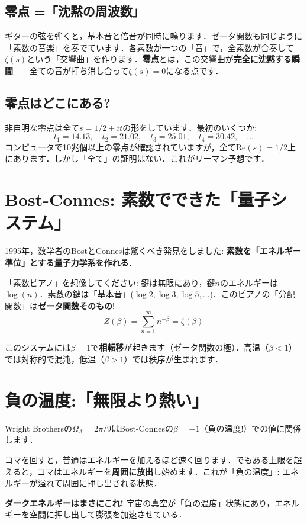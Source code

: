 \documentclass[11pt,a4paper]{article}
\begin{document}
\subsection{零点 =「沈黙の周波数」}
\begin{tcolorbox}[colback=blue!5,colframe=blue!50!black,title=アナロジー: ギターの弦]
ギターの弦を弾くと，基本音と倍音が同時に鳴ります．ゼータ関数も同じように「素数の音楽」を奏でています．各素数が一つの「音」で，全素数が合奏して$\zeta(s)$という「交響曲」を作ります．\textbf{零点}とは，この交響曲が\textbf{完全に沈黙する瞬間}——全ての音が打ち消し合って$\zeta(s)=0$になる点です．
\end{tcolorbox}
\subsection{零点はどこにある?}
非自明な零点は全て$s = 1/2 + it$の形をしています．最初のいくつか:
$$t_1 = 14.13,\quad t_2 = 21.02,\quad t_3 = 25.01,\quad t_4 = 30.42,\quad \ldots$$
コンピュータで10兆個以上の零点が確認されていますが，全て$\mathrm{Re}(s)=1/2$上にあります．しかし「全て」の証明はない．これがリーマン予想です．

\section{Bost-Connes: 素数でできた「量子システム」}
1995年，数学者のBostとConnesは驚くべき発見をしました: \textbf{素数を「エネルギー準位」とする量子力学系を作れる}．
\begin{tcolorbox}[colback=blue!5,colframe=blue!50!black,title=アナロジー: 素数ピアノ]
「素数ピアノ」を想像してください: 鍵は無限にあり，鍵$n$のエネルギーは$\log(n)$．素数の鍵は「基本音」($\log 2, \log 3, \log 5, \ldots$)．このピアノの「分配関数」は\textbf{ゼータ関数そのもの}!
$$Z(\beta) = \sum_{n=1}^{\infty} n^{-\beta} = \zeta(\beta)$$
\end{tcolorbox}
このシステムには$\beta = 1$で\textbf{相転移}が起きます（ゼータ関数の極）．高温（$\beta < 1$）では対称的で混沌，低温（$\beta > 1$）では秩序が生まれます．

\section{負の温度:「無限より熱い」}
Wright Brothersの$\Omega_\Lambda = 2\pi/9$はBost-Connesの$\beta = -1$（負の温度!）での値に関係します．
\begin{tcolorbox}[colback=blue!5,colframe=blue!50!black,title=アナロジー: コマの回転]
コマを回すと，普通はエネルギーを加えるほど速く回ります．でもある上限を超えると，コマはエネルギーを\textbf{周囲に放出}し始めます．これが「負の温度」: エネルギーが溢れて周囲に押し出される状態．
\end{tcolorbox}
\textbf{ダークエネルギーはまさにこれ!} 宇宙の真空が「負の温度」状態にあり，エネルギーを空間に押し出して膨張を加速させている．
\end{document}
